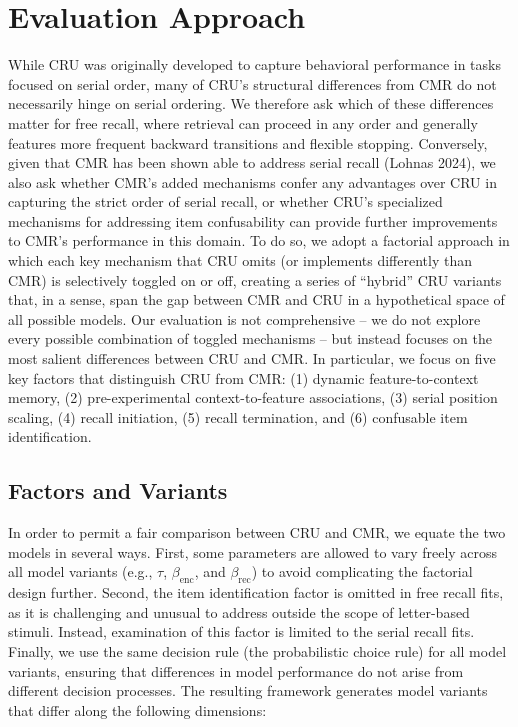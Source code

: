 \documentclass[
  letterpaper,
  DIV=11,
  numbers=noendperiod]{scrartcl}
\begin{document}
\section{Evaluation Approach}\label{evaluation-approach}

While CRU was originally developed to capture behavioral performance in
tasks focused on serial order, many of CRU's structural differences from
CMR do not necessarily hinge on serial ordering. We therefore ask which
of these differences matter for free recall, where retrieval can proceed
in any order and generally features more frequent backward transitions
and flexible stopping. Conversely, given that CMR has been shown able to
address serial recall (Lohnas 2024), we also ask whether CMR's added
mechanisms confer any advantages over CRU in capturing the strict order
of serial recall, or whether CRU's specialized mechanisms for addressing
item confusability can provide further improvements to CMR's performance
in this domain. To do so, we adopt a factorial approach in which each
key mechanism that CRU omits (or implements differently than CMR) is
selectively toggled on or off, creating a series of ``hybrid'' CRU
variants that, in a sense, span the gap between CMR and CRU in a
hypothetical space of all possible models. Our evaluation is not
comprehensive -- we do not explore every possible combination of toggled
mechanisms -- but instead focuses on the most salient differences
between CRU and CMR. In particular, we focus on five key factors that
distinguish CRU from CMR: (1) dynamic feature-to-context memory, (2)
pre-experimental context-to-feature associations, (3) serial position
scaling, (4) recall initiation, (5) recall termination, and (6)
confusable item identification.

\subsection{Factors and Variants}\label{factors-and-variants}

In order to permit a fair comparison between CRU and CMR, we equate the
two models in several ways. First, some parameters are allowed to vary
freely across all model variants (e.g., \(\tau\), \(\beta_\text{enc}\),
and \(\beta_\text{rec}\)) to avoid complicating the factorial design
further. Second, the item identification factor is omitted in free
recall fits, as it is challenging and unusual to address outside the
scope of letter-based stimuli. Instead, examination of this factor is
limited to the serial recall fits. Finally, we use the same decision
rule (the probabilistic choice rule) for all model variants, ensuring
that differences in model performance do not arise from different
decision processes. The resulting framework generates model variants
that differ along the following dimensions:
\end{document}
